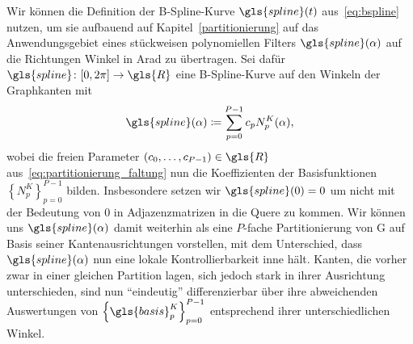 Wir können die Definition der B-Spline-Kurve $\gls{spline}\left(t\right)$ aus~\eqref{eq:bspline} nutzen, um sie aufbauend auf Kapitel~\ref{partitionierung} auf das Anwendungsgebiet eines stückweisen polynomiellen Filters $\gls{spline}\left(\alpha\right)$ auf die Richtungen \bzw{} Winkel in \gls{Arad} zu übertragen.
Sei dafür $\gls{spline} \colon \left[0, 2\pi\right] \to \gls{R}$ eine B-Spline-Kurve auf den Winkeln der Graphkanten mit
\begin{equation}
  \gls{spline}\left(\alpha\right) \coloneqq \sum_{p=0}^{P-1} c_p N_p^K\left(\alpha\right),
\end{equation}
wobei die freien Parameter $\left(c_0, \ldots, c_{P-1}\right) \in \gls{R}$ aus~\eqref{eq:partitionierung_faltung} nun die Koeffizienten der Basisfunktionen ${\left\{N_p^K\right\}}_{p=0}^{P-1}$ bilden.
Insbesondere setzen wir $\gls{spline}\left(0\right) = 0$ um nicht mit der Bedeutung von $0$ in Adjazenzmatrizen in die Quere zu kommen.
Wir können uns $\gls{spline}\left(\alpha\right)$ damit weiterhin als eine $P$-fache Partitionierung von \gls{G} auf Basis seiner Kantenausrichtungen vorstellen, mit dem Unterschied, dass $\gls{spline}\left(\alpha\right)$ nun eine lokale Kontrollierbarkeit inne hält.
Kanten, die vorher zwar in einer gleichen Partition lagen, sich jedoch \evtl{} stark in ihrer Ausrichtung unterschieden, sind nun \enquote{eindeutig} differenzierbar über ihre abweichenden Auswertungen von ${\left\{\gls{basis}_p^K\right\}}_{p=0}^{P-1}$ entsprechend ihrer unterschiedlichen Winkel.



